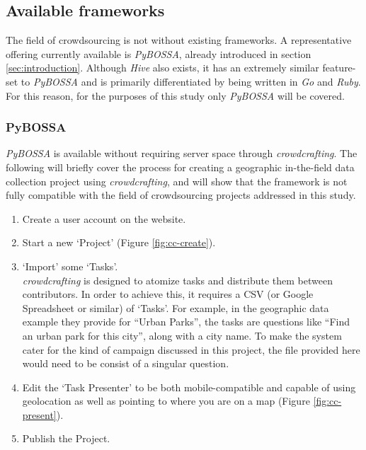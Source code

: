 \documentclass{article}
\begin{document}
		\subsection{Available frameworks}

		The field of crowdsourcing is not without existing frameworks. A representative offering currently available is \emph{PyBOSSA}, already introduced in section \ref{sec:introduction}. Although \emph{Hive} also exists, it has an extremely similar feature-set to \emph{PyBOSSA} and is primarily differentiated by being written in \emph{Go} and \emph{Ruby}\cite{_nytlabs/hive_????}. For this reason, for the purposes of this study only \emph{PyBOSSA} will be covered.

		\subsubsection{PyBOSSA}

		\emph{PyBOSSA} is available without requiring server space through \emph{crowdcrafting}. The following will briefly cover the process for creating a geographic in-the-field data collection project using \emph{crowdcrafting}, and will show that the framework is not fully compatible with the field of crowdsourcing projects addressed in this study.

		\begin{enumerate}
			\item Create a user account on the website.
			\item Start a new `Project' (Figure \ref{fig:cc-create}).
			\item `Import' some `Tasks'.\\
			\emph{crowdcrafting} is designed to atomize tasks and distribute them between contributors. In order to achieve this, it requires a CSV (or Google Spreadsheet or similar) of `Tasks'. For example, in the geographic data example they provide for ``Urban Parks'', the tasks are questions like ``Find an urban park for this city'', along with a city name\cite{_urban_????}. To make the system cater for the kind of campaign discussed in this project, the file provided here would need to be consist of a singular question.
			\item Edit the `Task Presenter' to be both mobile-compatible and capable of using geolocation as well as pointing to where you are on a map (Figure \ref{fig:cc-present}).
			\item Publish the Project.
		\end{enumerate}
\end{document}
